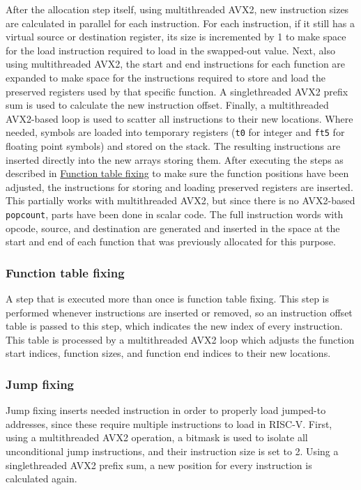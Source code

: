 \documentclass[11pt,dvipsnames]{article}
\newcommand{\mono}[1]{\texttt{#1}}
\begin{document}
After the allocation step itself, using multithreaded AVX2, new instruction sizes are calculated in parallel for each instruction. For each instruction, if it still has a virtual source or destination register, its size is incremented by 1 to make space for the load instruction required to load in the swapped-out value. Next, also using multithreaded AVX2, the start and end instructions for each function are expanded to make space for the instructions required to store and load the preserved registers used by that specific function. A singlethreaded AVX2 prefix sum is used to calculate the new instruction offset. Finally, a multithreaded AVX2-based loop is used to scatter all instructions to their new locations. Where needed, symbols are loaded into temporary registers (\mono{t0} for integer and \mono{ft5} for floating point symbols) and stored on the stack. The resulting instructions are inserted directly into the new arrays storing them. After executing the steps as described in \hyperref[functab]{Function table fixing} to make sure the function positions have been adjusted, the instructions for storing and loading preserved registers are inserted. This partially works with multithreaded AVX2, but since there is no AVX2-based \mono{popcount}, parts have been done in scalar code. The full instruction words with opcode, source, and destination are generated and inserted in the space at the start and end of each function that was previously allocated for this purpose.

\subsubsection*{Function table fixing} \label{functab}
A step that is executed more than once is function table fixing. This step is performed whenever instructions are inserted or removed, so an instruction offset table is passed to this step, which indicates the new index of every instruction. This table is processed by a multithreaded AVX2 loop which adjusts the function start indices, function sizes, and function end indices to their new locations.

\subsubsection{Jump fixing}
Jump fixing inserts needed instruction in order to properly load jumped-to addresses, since these require multiple instructions to load in RISC-V. First, using a multithreaded AVX2 operation, a bitmask is used to isolate all unconditional jump instructions, and their instruction size is set to 2. Using a singlethreaded AVX2 prefix sum, a new position for every instruction is calculated again.
\end{document}
